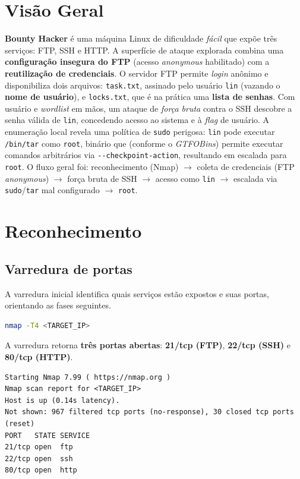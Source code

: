 \documentclass[12pt,a4paper]{article}
\begin{document}
\section{Visão Geral}
\textbf{Bounty Hacker} é uma máquina Linux de dificuldade \emph{fácil} que expõe
três serviços: FTP, SSH e HTTP. A superfície de ataque explorada combina uma
\textbf{configuração insegura do FTP} (acesso \emph{anonymous} habilitado) com a
\textbf{reutilização de credenciais}. O servidor FTP permite \emph{login}
anônimo e disponibiliza dois arquivos: \texttt{task.txt}, assinado pelo usuário
\texttt{lin} (vazando o \textbf{nome de usuário}), e \texttt{locks.txt}, que é na
prática uma \textbf{lista de senhas}. Com usuário e \emph{wordlist} em mãos,
um ataque de \emph{força bruta} contra o SSH descobre a senha válida de
\texttt{lin}, concedendo acesso ao sistema e à \emph{flag} de usuário. A
enumeração local revela uma política de \texttt{sudo} perigosa: \texttt{lin}
pode executar \texttt{/bin/tar} como \texttt{root}, binário que (conforme o
\emph{GTFOBins}) permite executar comandos arbitrários via
\texttt{-{}-checkpoint-action}, resultando em escalada para \texttt{root}.
O fluxo geral foi: reconhecimento (Nmap) $\rightarrow$ coleta de credenciais
(FTP \emph{anonymous}) $\rightarrow$ força bruta de SSH $\rightarrow$ acesso como
\texttt{lin} $\rightarrow$ escalada via \texttt{sudo}/\texttt{tar} mal
configurado $\rightarrow$ \texttt{root}.

\section{Reconhecimento}

\subsection{Varredura de portas}
A varredura inicial identifica quais serviços estão expostos e suas portas,
orientando as fases seguintes.

\begin{lstlisting}[language=bash,caption={Varredura de portas e serviços com Nmap.}]
nmap -T4 <TARGET_IP>
\end{lstlisting}

A varredura retorna \textbf{três portas abertas}: \textbf{21/tcp (FTP)},
\textbf{22/tcp (SSH)} e \textbf{80/tcp (HTTP)}.

\begin{lstlisting}[style=output,caption={Portas abertas retornadas pela varredura.}]
Starting Nmap 7.99 ( https://nmap.org )
Nmap scan report for <TARGET_IP>
Host is up (0.14s latency).
Not shown: 967 filtered tcp ports (no-response), 30 closed tcp ports (reset)
PORT   STATE SERVICE
21/tcp open  ftp
22/tcp open  ssh
80/tcp open  http
\end{lstlisting}
\end{document}
